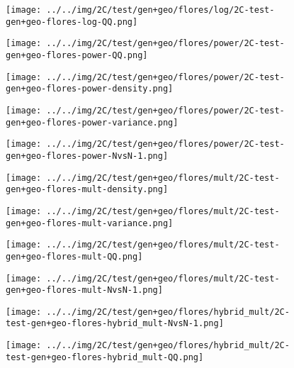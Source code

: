 \begin{figure}[H]
\centering	\texttt{[image: ../../img/2C/test/gen+geo/flores/log/2C-test-gen+geo-flores-log-QQ.png]}
\end{figure}
\begin{figure}[H]
\centering	\texttt{[image: ../../img/2C/test/gen+geo/flores/power/2C-test-gen+geo-flores-power-QQ.png]}
\end{figure}
\begin{figure}[H]
\centering	\texttt{[image: ../../img/2C/test/gen+geo/flores/power/2C-test-gen+geo-flores-power-density.png]}
\end{figure}
\begin{figure}[H]
\centering	\texttt{[image: ../../img/2C/test/gen+geo/flores/power/2C-test-gen+geo-flores-power-variance.png]}
\end{figure}
\begin{figure}[H]
\centering	\texttt{[image: ../../img/2C/test/gen+geo/flores/power/2C-test-gen+geo-flores-power-NvsN-1.png]}
\end{figure}
\begin{figure}[H]
\centering	\texttt{[image: ../../img/2C/test/gen+geo/flores/mult/2C-test-gen+geo-flores-mult-density.png]}
\end{figure}
\begin{figure}[H]
\centering	\texttt{[image: ../../img/2C/test/gen+geo/flores/mult/2C-test-gen+geo-flores-mult-variance.png]}
\end{figure}
\begin{figure}[H]
\centering	\texttt{[image: ../../img/2C/test/gen+geo/flores/mult/2C-test-gen+geo-flores-mult-QQ.png]}
\end{figure}
\begin{figure}[H]
\centering	\texttt{[image: ../../img/2C/test/gen+geo/flores/mult/2C-test-gen+geo-flores-mult-NvsN-1.png]}
\end{figure}
\begin{figure}[H]
\centering	\texttt{[image: ../../img/2C/test/gen+geo/flores/hybrid\_mult/2C-test-gen+geo-flores-hybrid\_mult-NvsN-1.png]}
\end{figure}
\begin{figure}[H]
\centering	\texttt{[image: ../../img/2C/test/gen+geo/flores/hybrid\_mult/2C-test-gen+geo-flores-hybrid\_mult-QQ.png]}
\end{figure}
